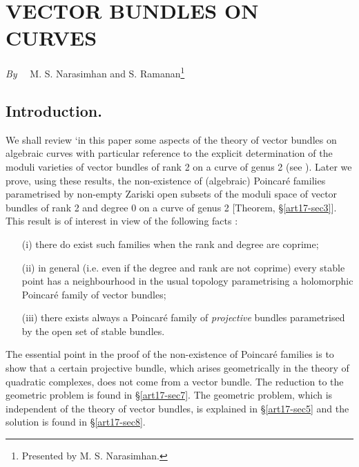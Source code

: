 \chapter[\textsc{M. S. Narasimhan} and \textsc{S. Ramanan~:} Vector Bundles on Curves]{VECTOR BUNDLES ON CURVES}\label{art17}

\begin{center}
{\em By}~~ M. S. Narasimhan and S. Ramanan\footnote{Presented by M. S. Narasimhan.}
\end{center}


\setcounter{pageoriginal}{334}
\section{Introduction.}\label{art17-sec1}
\pageoriginale


We shall review `in this paper some aspects of the theory of vector bundles on algebraic curves with particular reference to the explicit determination of the moduli varieties of vector bundles of rank 2 on a curve of genus 2 (see \cite{art17-key3}). Later we prove, using these results, the non-existence of (algebraic) Poincar\'e families parametrised by non-empty Zariski open subsets of the moduli space of vector bundles of rank 2 and degree 0 on a curve of genus 2 [Theorem, \S\ref{art17-sec3}]. This result is of interest in view of the following facts :
\begin{itemize}
\item[(i)] there do exist such families when the rank and degree are coprime;

\item[(ii)] in general (i.e. even if the degree and rank are not coprime) every stable point has a neighbourhood in the usual topology parametrising a holomorphic Poincar\'e family of vector bundles;

\item[(iii)] there exists always a Poincar\'e family of {\em projective} bundles para\-metrised by the open set of stable bundles.
\end{itemize}

The essential point in the proof of the non-existence of Poincar\'e families is to show that a certain projective bundle, which arises geometrically in the theory of quadratic complexes, does not come from a vector bundle. The reduction to the geometric problem is found in \S\ref{art17-sec7}. The geometric problem, which is independent of the theory of vector bundles, is explained in \S\ref{art17-sec5} and the solution is found in \S\ref{art17-sec8}.

